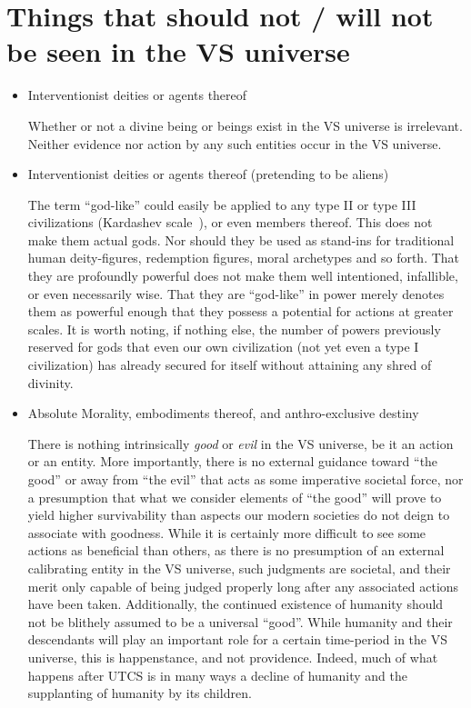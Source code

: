 \section{Things that should not / will not be seen in the VS universe}
\label{sec:thingsnotinVSU}
\begin{itemize}

\item Interventionist deities or agents thereof

Whether or not a divine being or beings exist in the VS universe is
irrelevant. Neither evidence nor action by any such entities occur in
the VS universe.

\item Interventionist deities or agents thereof (pretending to be aliens)

The term ``god-like'' could easily be applied to any type II or type
III civilizations (Kardashev scale~\cite{Kardashev}), or even members
thereof. This does not make them actual gods. Nor should they be used
as stand-ins for traditional human deity-figures, redemption figures,
moral archetypes and so forth. That they are profoundly powerful does
not make them well intentioned, infallible, or even necessarily
wise. That they are ``god-like'' in power merely denotes them as
powerful enough that they possess a potential for actions at greater
scales. It is worth noting, if nothing else, the number of powers
previously reserved for gods that even our own civilization (not yet
even a type I civilization) has already secured for itself without attaining
any shred of divinity.

\item Absolute Morality, embodiments thereof, and anthro-exclusive destiny

There is nothing intrinsically {\em good} or {\em evil} in the VS
universe, be it an action or an entity. More importantly, there is no
external guidance toward ``the good'' or away from ``the evil'' that
acts as some imperative societal force, nor a presumption that what we
consider elements of ``the good'' will prove to yield higher
survivability than aspects our modern societies do not deign to
associate with goodness. While it is certainly more difficult to see
some actions as beneficial than others, as there is no presumption of
an external calibrating entity in the VS universe, such judgments are
societal, and their merit only capable of being judged properly long
after any associated actions have been taken. Additionally, the
continued existence of humanity should not be blithely assumed to be a
universal ``good''. While humanity and their descendants will play an
important role for a certain time-period in the VS universe, this is
happenstance, and not providence. Indeed, much of what happens after
UTCS is in many ways a decline of humanity and the supplanting of
humanity by its children.


\end{itemize}
